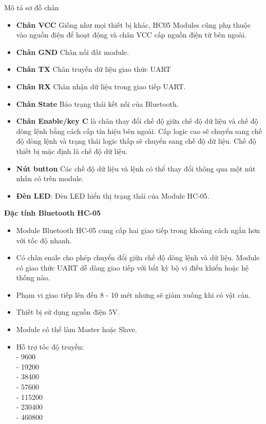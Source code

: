 Mô tả sơ đồ chân
\begin{itemize}
    

\item \textbf{Chân VCC} Giống như mọi thiết bị khác, HC05 Modules cũng phụ thuộc vào nguồn điện để hoạt động và chân VCC cấp nguồn điện từ bên ngoài.

\item \textbf{Chân GND} Chân nối đất module.

\item \textbf{Chân TX} Chân truyền dữ liệu giao thức UART

\item \textbf{Chân RX} Chân nhận dữ liệu trong giao tiếp UART.

\item \textbf{Chân State} Báo trạng thái kết nối của Bluetooth.

\item \textbf{Chân Enable/key C} là chân thay đổi chế độ giữa chế độ dữ liệu và chế độ dòng lệnh bằng cách cấp tín hiệu bên ngoài. Cấp logic cao sẽ chuyển sang chế độ dòng lệnh và trạng thái logic thấp sẽ chuyển sang chế độ dữ liệu. Chế độ thiết bị mặc định là chế độ dữ liệu.

\item \textbf{Nút button} Các chế độ dữ liệu và lệnh có thể thay đổi thông qua một nút nhấn có trên module.

\item \textbf{Đèn LED}: Đèn LED hiển thị trạng thái của Module HC-05.

\end{itemize}

\indent \textbf{Đặc tính Bluetooth HC-05 }
\begin{itemize}
\item Module Bluetooth HC-05 cung cấp hai giao tiếp trong khoảng cách ngắn hơn với tốc độ nhanh.
\item  Có chân enale cho phép chuyển đổi giữa chế độ dòng lệnh và dữ liệu.
Module có giao thức UART dễ dàng giao tiếp với bất kỳ bộ vi điều khiển hoặc hệ thống nào.
\item  Phạm vi giao tiếp lên đến 8 - 10 mét nhưng sẽ giảm xuống khi có vật cản.
\item  Thiết bị sử dụng nguồn điện 5V.
 \item  Module có thể làm Master hoặc Slave.
\item  Hỗ trợ tốc độ truyền:\\
- 9600\\
- 19200\\
- 38400\\
- 57600\\
- 115200\\
- 230400\\
- 460800
\end{itemize}
